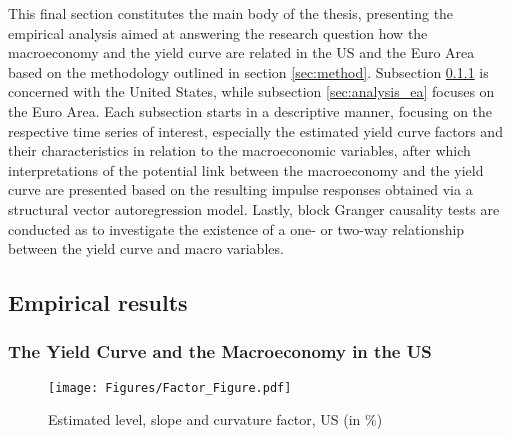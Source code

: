 This final section constitutes the main body of the thesis, presenting the empirical analysis aimed at answering the research question how the macroeconomy and the yield curve are related in the US and the Euro Area based on the methodology outlined in section \ref{sec:method}. Subsection \ref{sec:analysis_us} is concerned with the United States, while subsection \ref{sec:analysis_ea} focuses on the Euro Area. Each subsection starts in a descriptive manner, focusing on the respective time series of interest, especially the estimated yield curve factors and their characteristics in relation to the macroeconomic variables, after which interpretations of the potential link between the macroeconomy and the yield curve are presented based on the resulting impulse responses obtained via a structural vector autoregression model. 
Lastly, block Granger causality tests are conducted as to investigate the existence of a one- or two-way relationship between the yield curve and macro variables.  

\subsection{Empirical results}

\subsubsection{The Yield Curve and the Macroeconomy in the US}
\label{sec:analysis_us}

\begin{figure}[!t]
    \centering
    \texttt{[image: Figures/Factor\_Figure.pdf]}
    \caption{Estimated level, slope and curvature factor, US (in \%)}
    \label{fig:factors_us}
\end{figure}


